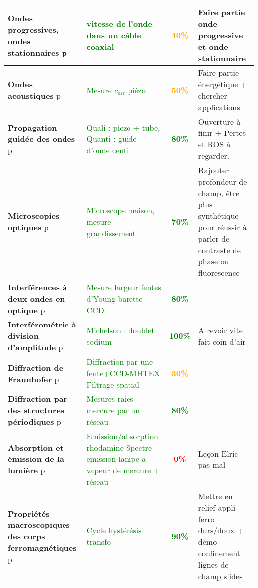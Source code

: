 \begin{changemargin}{-1.5cm}{-0cm}
\begin{center}
\begin{tabularx}{\paperwidth-2cm}{| X | X | c | X |}
\hline
  \textbf{Ondes progressives, ondes stationnaires} p\pageref{LP_OndesProgressives}~& \textcolor{green}{vitesse de l'onde dans un câble coaxial} & \textcolor{orange}{\textbf{40\%}} & Faire partie onde progressive et onde stationnaire \\
  \hline
  \textbf{Ondes acoustiques} p\pageref{LP_OndeAcoustique}~& \textcolor{green}{Mesure $c_{air}$ piézo} & \textcolor{orange}{\textbf{50\%}} & Faire partie énergétique + chercher applications \\
  \hline
  \textbf{Propagation guidée des ondes} p\pageref{LP_PropagationGuidee} & \textcolor{green}{Quali : piezo + tube}, \textcolor{green}{Quanti : guide d'onde centi}& \textcolor{green}{\textbf{80\%}} & Ouverture à finir + Pertes et ROS à regarder. \\
  \hline
  \textbf{Microscopies optiques} p\pageref{LP_Microscopie}~& \textcolor{green}{Microscope maison, mesure grandissement}~& \textcolor{green}{\textbf{70\%}} & Rajouter profondeur de champ, être plus synthétique pour réussir à parler de contraste de phase ou fluorescence \\
  \hline
  \textbf{Interférences à deux ondes en optique} p\pageref{LP_InterferencesDeuxOndes}~& \textcolor{green}{Mesure largeur fentes d'Young barette CCD} & \textcolor{green}{\textbf{80\%}} & \\
  \hline
  \textbf{Interférométrie à division d'amplitude} p\pageref{LP_DivisionAmplitude} & \textcolor{green}{Michelson : doublet sodium} & \textcolor{green}{\textbf{100\%}} & A revoir vite fait coin d'air \\
  \hline
  \textbf{Diffraction de Fraunhofer} p\pageref{LP_DiffractionFraunhofer} & \textcolor{green}{Diffraction par une fente+CCD-MHTEX} \textcolor{green}{Filtrage spatial} & \textcolor{orange}{\textbf{30\%}} &  \\
  \hline
  \textbf{Diffraction par des structures périodiques} p\pageref{LP_DiffractionPeriodique} & \textcolor{green}{Mesures raies mercure par un réseau} & \textcolor{green}{\textbf{80\%}} & \\
  \hline
  \textbf{Absorption et émission de la lumière} p\pageref{LP_Absorption} & \textcolor{green}{Emission/absorption rhodamine} \textcolor{green}{Spectre emission lampe à vapeur de mercure + réseau} & \textcolor{red}{\textbf{0\%}} & Leçon Elric pas mal \\
  \hline
  \hline
  \textbf{Propriétés macroscopiques des corps ferromagnétiques } p\pageref{LP_Ferromagnetisme} & \textcolor{green}{Cycle hystérésis transfo} & \textcolor{green}{\textbf{90\%}} & Mettre en relief appli ferro durs/doux + démo confinement lignes de champ slides \\

\end{tabularx}
\end{center}
\end{changemargin}
